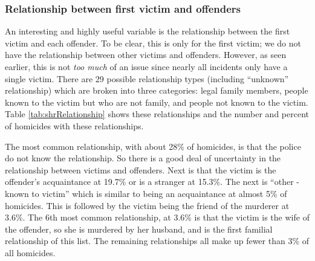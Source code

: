 \documentclass[
]{krantz}
\begin{document}
\subsubsection{Relationship between first victim and
offenders}\label{relationship-between-first-victim-and-offenders}

An interesting and highly useful variable is the
relationship between the first victim and each offender. To
be clear, this is only for the first victim; we do not have
the relationship between other victims and offenders.
However, as seen earlier, this is not \emph{too much} of an
issue since nearly all incidents only have a single victim.
There are 29 possible relationship types (including
``unknown'' relationship) which are broken into three
categories: legal family members, people known to the victim
but who are not family, and people not known to the victim.
Table \ref{tab:shrRelationship} shows these relationships
and the number and percent of homicides with these
relationships.

The most common relationship, with about 28\% of homicides,
is that the police do not know the relationship. So there is
a good deal of uncertainty in the relationship between
victims and offenders. Next is that the victim is the
offender's acquaintance at 19.7\% or is a stranger at
15.3\%. The next is ``other - known to victim'' which is
similar to being an acquaintance at almost 5\% of homicides.
This is followed by the victim being the friend of the
murderer at 3.6\%. The 6th most common relationship, at
3.6\% is that the victim is the wife of the offender, so she
is murdered by her husband, and is the first familial
relationship of this list. The remaining relationships all
make up fewer than 3\% of all homicides.
\end{document}
